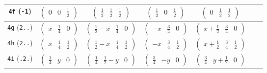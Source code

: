\documentclass[fleqn,9pt,landscape]{jsarticle}
\begin{document}
\begin{center}
\begin{longtable}{ccccccc}
{\tt 4f} ({\tt -1}) & $ \begin{pmatrix} 0 & 0 & \frac{1}{2} \end{pmatrix} $ & $ \begin{pmatrix} \frac{1}{2} & \frac{1}{2} & \frac{1}{2} \end{pmatrix} $ & $ \begin{pmatrix} \frac{1}{2} & 0 & \frac{1}{2} \end{pmatrix} $ & $ \begin{pmatrix} 0 & \frac{1}{2} & \frac{1}{2} \end{pmatrix} $ & $  $ & $  $ \\ \hline
{\tt 4g} ({\tt 2..}) & $ \begin{pmatrix} x & \frac{1}{4} & 0 \end{pmatrix} $ & $ \begin{pmatrix} \frac{1}{2} - x & \frac{1}{4} & 0 \end{pmatrix} $ & $ \begin{pmatrix} - x & \frac{3}{4} & 0 \end{pmatrix} $ & $ \begin{pmatrix} x + \frac{1}{2} & \frac{3}{4} & 0 \end{pmatrix} $ & $  $ & $  $ \\ \hline
{\tt 4h} ({\tt 2..}) & $ \begin{pmatrix} x & \frac{1}{4} & \frac{1}{2} \end{pmatrix} $ & $ \begin{pmatrix} \frac{1}{2} - x & \frac{1}{4} & \frac{1}{2} \end{pmatrix} $ & $ \begin{pmatrix} - x & \frac{3}{4} & \frac{1}{2} \end{pmatrix} $ & $ \begin{pmatrix} x + \frac{1}{2} & \frac{3}{4} & \frac{1}{2} \end{pmatrix} $ & $  $ & $  $ \\ \hline
{\tt 4i} ({\tt .2.}) & $ \begin{pmatrix} \frac{1}{4} & y & 0 \end{pmatrix} $ & $ \begin{pmatrix} \frac{1}{4} & \frac{1}{2} - y & 0 \end{pmatrix} $ & $ \begin{pmatrix} \frac{3}{4} & - y & 0 \end{pmatrix} $ & $ \begin{pmatrix} \frac{3}{4} & y + \frac{1}{2} & 0 \end{pmatrix} $ & $  $ & $  $ \\ \hline

\end{longtable}
\end{center}
\end{document}
